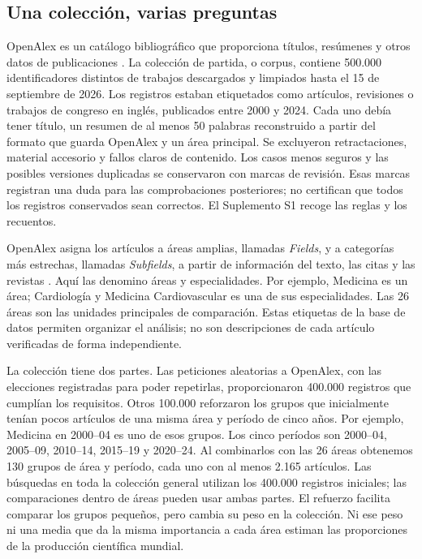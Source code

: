 \documentclass[12pt]{article}
\begin{document}
\subsection{Una colección, varias preguntas}
OpenAlex es un catálogo bibliográfico que proporciona títulos, resúmenes y otros datos de publicaciones \citep{priem2022openalex}. La colección de partida, o corpus, contiene 500.000 identificadores distintos de trabajos descargados y limpiados hasta el 15 de septiembre de 2026. Los registros estaban etiquetados como artículos, revisiones o trabajos de congreso en inglés, publicados entre 2000 y 2024. Cada uno debía tener título, un resumen de al menos 50 palabras reconstruido a partir del formato que guarda OpenAlex y un área principal. Se excluyeron retractaciones, material accesorio y fallos claros de contenido. Los casos menos seguros y las posibles versiones duplicadas se conservaron con marcas de revisión. Esas marcas registran una duda para las comprobaciones posteriores; no certifican que todos los registros conservados sean correctos. El Suplemento S1 recoge las reglas y los recuentos.

OpenAlex asigna los artículos a áreas amplias, llamadas \emph{Fields}, y a categorías más estrechas, llamadas \emph{Subfields}, a partir de información del texto, las citas y las revistas \citep{openalex2026topics}. Aquí las denomino áreas y especialidades. Por ejemplo, Medicina es un área; Cardiología y Medicina Cardiovascular es una de sus especialidades. Las 26 áreas son las unidades principales de comparación. Estas etiquetas de la base de datos permiten organizar el análisis; no son descripciones de cada artículo verificadas de forma independiente.

La colección tiene dos partes. Las peticiones aleatorias a OpenAlex, con las elecciones registradas para poder repetirlas, proporcionaron 400.000 registros que cumplían los requisitos. Otros 100.000 reforzaron los grupos que inicialmente tenían pocos artículos de una misma área y período de cinco años. Por ejemplo, Medicina en 2000--04 es uno de esos grupos. Los cinco períodos son 2000--04, 2005--09, 2010--14, 2015--19 y 2020--24. Al combinarlos con las 26 áreas obtenemos 130 grupos de área y período, cada uno con al menos 2.165 artículos. Las búsquedas en toda la colección general utilizan los 400.000 registros iniciales; las comparaciones dentro de áreas pueden usar ambas partes. El refuerzo facilita comparar los grupos pequeños, pero cambia su peso en la colección. Ni ese peso ni una media que da la misma importancia a cada área estiman las proporciones de la producción científica mundial.
\end{document}
